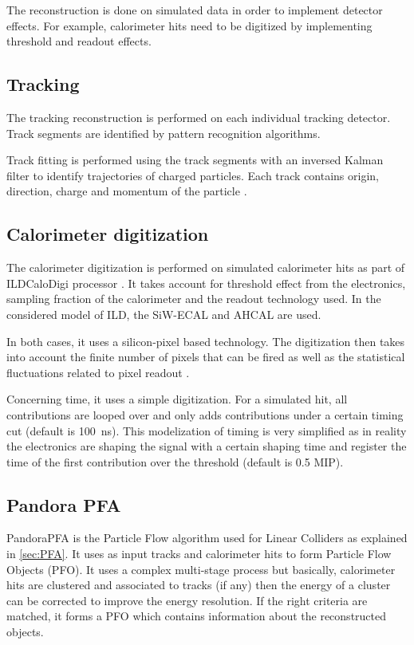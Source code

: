 The reconstruction is done on simulated data in order to implement detector effects. For example, calorimeter hits need to be digitized by implementing threshold and readout effects.

\subsection{Tracking}

The tracking reconstruction is performed on each individual tracking detector. Track segments are identified by pattern recognition algorithms.

Track fitting is performed using the track segments with an inversed Kalman filter to identify trajectories of charged particles. Each track contains origin, direction, charge and momentum of the particle \cite{Fruhwirth:1987fm}.

\subsection{Calorimeter digitization}
\label{subsec:ILDDigiCalo}

The calorimeter digitization is performed on simulated calorimeter hits as part of ILDCaloDigi processor \cite{Jeans2015}. It takes account for threshold effect from the electronics, sampling fraction of the calorimeter and the readout technology used. In the considered model of ILD, the SiW-ECAL and AHCAL are used.

In both cases, it uses a silicon-pixel based technology. The digitization then takes into account the finite number of pixels that can be fired as well as the statistical fluctuations related to pixel readout \cite{Hartbrich:2016bbz}.

Concerning time, it uses a simple digitization. For a simulated hit, all contributions are looped over and only adds contributions under a certain timing cut (default is \SI{100}{\ns}). This modelization of timing is very simplified as in reality the electronics are shaping the signal with a certain shaping time and register the time of the first contribution over the threshold (default is 0.5 MIP).

\subsection{Pandora PFA}

PandoraPFA \cite{Thomson:2009rp} is the Particle Flow algorithm used for Linear Colliders as explained in \ref{sec:PFA}. It uses as input tracks and calorimeter hits to form Particle Flow Objects (PFO). It uses a complex multi-stage process but basically, calorimeter hits are clustered and associated to tracks (if any) then the energy of a cluster can be corrected to improve the energy resolution. If the right criteria are matched, it forms a PFO which contains information about the reconstructed objects.

